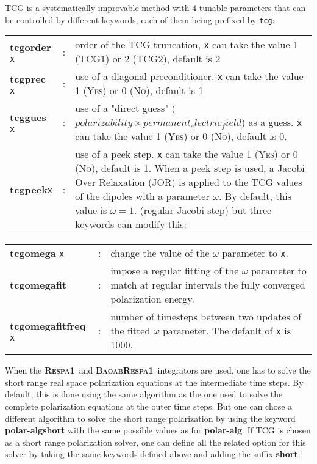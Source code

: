 \documentclass[peerreview]{IEEEtran}
\def\respaone{\textbf{\textsc{Respa1}}}
\def\baoabrespaone{\textbf{\textsc{BaoabRespa1}}}
\newlength{\mylen}
\begin{document}
\vskip5mm
TCG is a systematically improvable method with 4 tunable parameters that can be controlled by different keywords, each of them being prefixed by \texttt{tcg}:

\setlength{\tabcolsep}{2pt}
\begin{tabular}{llp{15.9cm}}
\textbf{tcgorder} \texttt{x}& : &order of the TCG truncation, \texttt{x} can take the value 1 (TCG1) or 2 (TCG2), default is 2\\
\textbf{tcgprec} \texttt{x} &: &use of a diagonal preconditioner. \texttt{x} can take the value 1 (\textsc{Yes}) or 0 (\textsc{No}), default is 1\\
\textbf{tcggues} \texttt{x} &: &use of a "direct guess" ($polarizability\times permanent_electric_field$) as a guess. \texttt{x} can take the value 1 (\textsc{Yes}) or 0 (\textsc{No}), default is 0.\\
\textbf{tcgpeek}\texttt{x} &: &use of a peek step. \texttt{x} can take the value 1 (\textsc{Yes}) or 0 (\textsc{No}), default is 1. When a peek step is used, a Jacobi Over Relaxation (JOR) is applied to the TCG values of the dipoles with a parameter \textbf{$\omega$}. By default, this value is $\omega=1$. (regular Jacobi step) but three keywords can modify this:\\
\end{tabular}

\hskip5mm
\begin{tabular}{llp{14.25cm}}
\textbf{tcgomega} \texttt{x} &: &change the value of the  $\omega$ parameter to \texttt{x}.\\
\textbf{tcgomegafit} &: &impose a regular fitting of the $\omega$ parameter to match at regular intervals the fully converged polarization energy.\\
\textbf{tcgomegafitfreq} \texttt{x}& :& number of timesteps between two updates of the fitted $\omega$ parameter. The default of \texttt{x} is 1000.\\
\end{tabular}

\vskip5mm
When the \respaone\ and \baoabrespaone\ integrators are used, one has to solve the short range real space polarization equations at the intermediate time steps. By default, this is done using the same algorithm as the one used to solve the complete polarization equations at the outer time steps. But one can chose a different algorithm to solve the short range polarization by using the keyword \textbf{polar-algshort} with the same possible values as for \textbf{polar-alg}. If TCG is chosen as a short range polarization solver, one can define all the related option for this solver by taking the same keywords defined above and adding the suffix \textbf{short}:
\end{document}
